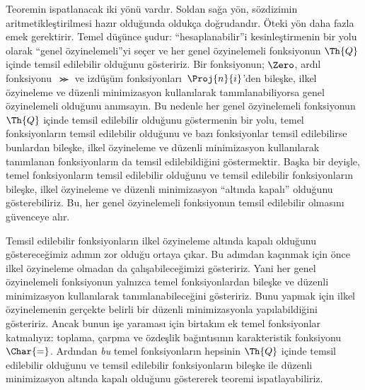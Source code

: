Teoremin ispatlanacak iki yönü vardır. Soldan sağa yön, sözdizimin
aritmetikleştirilmesi hazır olduğunda oldukça doğrudandır. Öteki yön daha
fazla emek gerektirir. Temel düşünce şudur: ``hesaplanabilir''i kesinleştirmenin
bir yolu olarak ``genel özyinelemeli''yi seçer ve her genel özyinelemeli
fonksiyonun $\Th{Q}$ içinde temsil edilebilir olduğunu gösteririz. Bir
fonksiyonun; $\Zero$, ardıl fonksiyonu~$\Succ$ ve izdüşüm
fonksiyonları~$\Proj{n}{i}$'den bileşke, ilkel özyineleme ve düzenli
minimizasyon kullanılarak tanımlanabiliyorsa genel özyinelemeli olduğunu
anımsayın. Bu nedenle her genel özyinelemeli fonksiyonun $\Th{Q}$ içinde
temsil edilebilir olduğunu göstermenin bir yolu, temel fonksiyonların temsil
edilebilir olduğunu ve bazı fonksiyonlar temsil edilebilirse bunlardan
bileşke, ilkel özyineleme ve düzenli minimizasyon kullanılarak tanımlanan
fonksiyonların da temsil edilebildiğini göstermektir. Başka bir deyişle,
temel fonksiyonların temsil edilebilir olduğunu ve temsil edilebilir
fonksiyonların bileşke, ilkel özyineleme ve düzenli minimizasyon ``altında
kapalı'' olduğunu gösterebiliriz. Bu, her genel özyinelemeli fonksiyonun
temsil edilebilir olmasını güvenceye alır.

Temsil edilebilir fonksiyonların ilkel özyineleme altında kapalı olduğunu
göstereceğimiz adımın zor olduğu ortaya çıkar. Bu adımdan kaçınmak için önce
ilkel özyineleme olmadan da çalışabileceğimizi gösteririz. Yani her genel
özyinelemeli fonksiyonun yalnızca temel fonksiyonlardan bileşke ve düzenli
minimizasyon kullanılarak tanımlanabileceğini gösteririz. Bunu yapmak için
ilkel özyinelemenin gerçekte belirli bir düzenli minimizasyonla yapılabildiğini
gösteririz. Ancak bunun işe yaraması için birtakım ek temel fonksiyonlar
katmalıyız: toplama, çarpma ve özdeşlik bağıntısının karakteristik
fonksiyonu~$\Char{=}$. Ardından \emph{bu} temel fonksiyonların hepsinin
$\Th{Q}$ içinde temsil edilebilir olduğunu ve temsil edilebilir fonksiyonların
bileşke ile düzenli minimizasyon altında kapalı olduğunu göstererek teoremi
ispatlayabiliriz.

